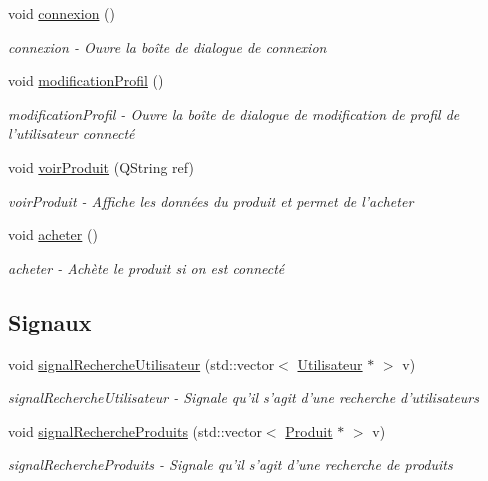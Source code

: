 \begin{DoxyCompactItemize}
void \hyperlink{class_ma_fenetre_a65270bfc0eeecb1003c6abc9a1199f32}{connexion} ()
\begin{DoxyCompactList}\small\item\em connexion -\/ Ouvre la boîte de dialogue de connexion \end{DoxyCompactList}\item 
void \hyperlink{class_ma_fenetre_a4568c5e0376f04b9d1ab6c54b9f7c7ed}{modification\-Profil} ()
\begin{DoxyCompactList}\small\item\em modification\-Profil -\/ Ouvre la boîte de dialogue de modification de profil de l'utilisateur connecté \end{DoxyCompactList}\item 
void \hyperlink{class_ma_fenetre_ade3a46e2b308936d934503a88275495a}{voir\-Produit} (Q\-String ref)
\begin{DoxyCompactList}\small\item\em voir\-Produit -\/ Affiche les données du produit et permet de l'acheter \end{DoxyCompactList}\item 
void \hyperlink{class_ma_fenetre_a44eae809341ad4816d8ca151d9b703fb}{acheter} ()
\begin{DoxyCompactList}\small\item\em acheter -\/ Achète le produit si on est connecté \end{DoxyCompactList}\end{DoxyCompactItemize}
\subsection*{Signaux}
\begin{DoxyCompactItemize}
\item 
void \hyperlink{class_ma_fenetre_aed4dd546bfb6e374aa317946e9247d4f}{signal\-Recherche\-Utilisateur} (std\-::vector$<$ \hyperlink{class_utilisateur}{Utilisateur} $\ast$ $>$ v)
\begin{DoxyCompactList}\small\item\em signal\-Recherche\-Utilisateur -\/ Signale qu'il s'agit d'une recherche d'utilisateurs \end{DoxyCompactList}\item 
void \hyperlink{class_ma_fenetre_a75cd895beb38fe68a4319eb6c37ac8ee}{signal\-Recherche\-Produits} (std\-::vector$<$ \hyperlink{class_produit}{Produit} $\ast$ $>$ v)
\begin{DoxyCompactList}\small\item\em signal\-Recherche\-Produits -\/ Signale qu'il s'agit d'une recherche de produits \end{DoxyCompactList}\end{DoxyCompactItemize}
